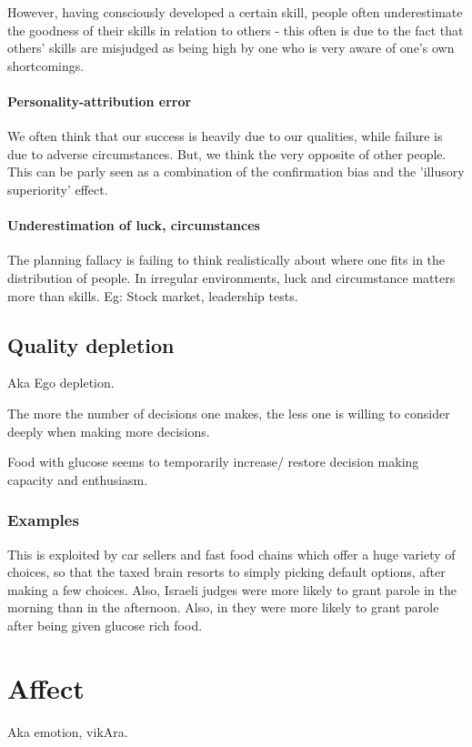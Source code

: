 \documentclass[oneside, article]{memoir}
\begin{document}
However, having consciously developed a certain skill, people often underestimate the goodness of their skills in relation to others - this often is due to the fact that others' skills are misjudged as being high by one who is very aware of one's own shortcomings.

\subsubsection{Personality-attribution error}
We often think that our success is heavily due to our qualities, while failure is due to adverse circumstances. But, we think the very opposite of other people. This can be parly seen as a combination of the confirmation bias and the 'illusory superiority' effect.

\subsubsection{Underestimation of luck, circumstances}
The planning fallacy is failing to think realistically about where one fits in the distribution of people. In irregular environments, luck and circumstance matters more than skills.
Eg: Stock market, leadership tests.

\section{Quality depletion}
Aka Ego depletion.

The more the number of decisions one makes, the less one is willing to consider deeply when making more decisions.

Food with glucose seems to temporarily increase/ restore decision making capacity and enthusiasm.

\subsection{Examples}
This is exploited by car sellers and fast food chains which offer a huge variety of choices, so that the taxed brain resorts to simply picking default options, after making a few choices. Also, Israeli judges were more likely to grant parole in the morning than in the afternoon. Also, in they were more likely to grant parole after being given glucose rich food.

\chapter{Affect}
Aka emotion, vikAra.
\end{document}

